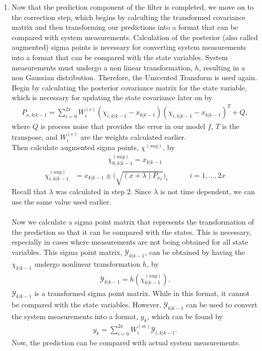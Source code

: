 \begin{enumerate}
        
                \item Now that the prediction component of the filter is completed, we move on to the correction step, which begins by calculting the transformed covariance matrix and then transforming our predictions into a format that can be compared with system measurements. Calculation of the posterior (also called augmented) sigma points is necessary for converting system measurements into a format that can be compared with the state variables. System measurements must undergo a non linear transformation, $h$, resulting in a non Gaussian distribution. Therefore, the Unscented Transform is used again.
                Begin by calculating the posterior covariance matrix for the state variable, which is necessary for updating the state covariance later on by
        \begin{align*}
        P_{x, k | k-1} = \sum^{2x}_{i = 0} W_i^{(c)} (\chi_{i, k | k - 1} -   x_{k|k-1} )(\chi_{i, k | k - 1} - x_{k|k-1} )^T + Q,
        \end{align*} 
        where $Q$ is process noise that provides the error in our model $f$, $T$ is the transpose, and $W_i^{(c)}$ are the weights calculated earlier. \\     
                
\noindent Then calculate augmented sigma points, $\chi^{(aug)}$, by
      \begin{align*}
        \chi^{(aug)}_{0, k|k-1} =  x_{k|k-1}
        \end{align*}
         \begin{align*}
        \chi^{(aug)}_{ i,k |k-1} &= x_{k|k-1}  \pm \bigg(\sqrt{(x+\lambda)P_{x_k}} \bigg)_{i} \quad \quad \quad  i=1,\dots,2x
        \end{align*}
        Recall that $\lambda$ was calculated in step 2. Since $\lambda$ is not time dependent, we can use the same value used earlier. \\ \\
        Now we calculate a sigma point matrix that represents the transformation of the prediction so that it can be compared with the states. This is necessary, especially in cases where measurements are not being obtained for all state variables. This sigma point matrix, $\mathcal{Y}_{k|k-1}$, can be obtained by having the $\chi_{k|k-1}$ undergo nonlinear transformation $h$, by
         \begin{align*}
       \mathcal{Y}_{k|k-1} = h(\chi^{(aug)}_{k|k-1}).
       \end{align*}
       $\mathcal{Y}_{k|k-1} $ is a transformed sigma point matrix. While in this format, it cannot be compared with the state variables. However, $\mathcal{Y}_{k|k-1}$ can be used to convert the system measurements into a format, $y_{k} $, which can be found by 
       \begin{align*}
       y_{k} = \sum^{2x}_{i = 0} W_i^{(m)}  \mathcal{Y}_{i, k | k - 1}.
       \end{align*}
       Now, the prediction can be compared with actual system measurements.
       

\end{enumerate}
